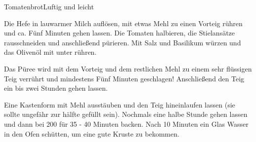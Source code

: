 \begin{recipe}{Tomatenbrot}{Luftig und leicht}
  \label{Tomatenbrot}
  \inglist

  \steps
  Die Hefe in lauwarmer Milch auflösen, mit etwas Mehl zu einen Vorteig rühren und ca.
  Fünf Minuten gehen lassen. Die Tomaten halbieren, die Stielansätze rausschneiden und
  anschließend pürieren. Mit Salz und Basilikum würzen und das Olivenöl mit unter rühren.

  Das Püree wird mit dem Vorteig und dem restlichen Mehl zu einem sehr flüssigen Teig
  verrührt und mindestens Fünf Minuten geschlagen! Anschließend den Teig ein bis zwei
  Stunden gehen lassen.

  Eine Kastenform mit Mehl ausstäuben und den Teig hineinlaufen lassen (sie sollte
  ungefähr zur hälfte gefüllt sein). Nochmals eine halbe Stunde gehen lassen und dann bei
  200 \celsius für 35 - 40 Minuten backen. Nach 10 Minuten ein Glas Wasser in den Ofen
  schütten, um eine gute Kruste zu bekommen.
\end{recipe}
